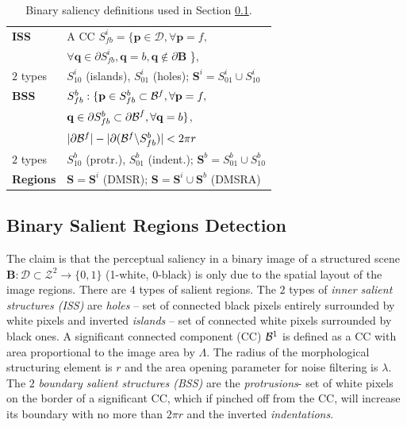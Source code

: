 \documentclass{article}
\def\B{{\mathbf B}}
\def\mcD{{\mathcal{D}}}
\def\p{{\mathbf p}}
\def\q{{\mathbf q}}
\def\S{{\mathbf S}}
\begin{document}
\begin{table}[hbt]
\begin{minipage}[b]{0.99\linewidth}\begin{tabular}{|l l|}
\hline
{\bf ISS} & A CC $S^i_{fb} = \{\p \in \mcD, \forall \p=f,$\\&$\forall \q \in \partial S^i_{fb}, \q=b, \q \notin \partial \B $ \},\\
$2$ types & $S^i_{10}$ (islands), $S^i_{01}$  (holes); $\S^i = S_{01}^i \cup S_{10}^i$\\
{\bf BSS} &  $S_{fb}^b: \{\p \in S_{fb}^b \subset{\cal B}^f, \forall \p = f,$\\&$ \q \in \partial S_{fb}^b \subset {\partial \cal B}^f,\forall \q = b \}$, \\
& $|\partial {\cal B}^f| - |\partial ({\cal B}^f \backslash S_{fb}^b)| < 2 \pi r$\\
$2$ types & $S^b_{10}$ (protr.), $S^b_{01}$ (indent.); $\S^b = S_{01}^b \cup S_{10}^b$\\
{\bf Regions} &  $\S = \S^i$ (DMSR); $\S = \S^i \cup \S^b$ (DMSRA)  \\
\hline
\end{tabular}
\hfill
\centering
\caption{Binary saliency definitions used in Section \ref{ssec:binary}.}\label{table:binary_sal}
\end{minipage}
\vspace*{-0.4cm}
\end{table}


\subsection{Binary Salient Regions Detection}
\label{ssec:binary}
The claim is that the perceptual saliency in a binary image of a structured scene 
 $\B: \mcD \subset \mathcal{Z}^2 \rightarrow \{0,1\}$ (1-white, 0-black)
is only due to the spatial layout of the image regions. 
There are  $4$ types of salient regions. The $2$ types of {\em inner salient structures (ISS)} are {\em holes} -- set of connected black pixels entirely surrounded by white pixels and inverted {\em islands} -- set of connected white pixels surrounded by black ones. A significant connected component (CC) ${\cal B}^1$ is defined as a CC with area proportional to the image area by $\Lambda$. The radius of the morphological structuring element is $r$ and  the area opening parameter for  noise filtering is $\lambda$. The $2$ {\em boundary salient structures (BSS)} are the {\em protrusions}- set of white pixels on the border of a significant CC, which if pinched off from the CC, will increase its boundary with no more than $2\pi r$ and the inverted {\em indentations}. 
\end{document}
